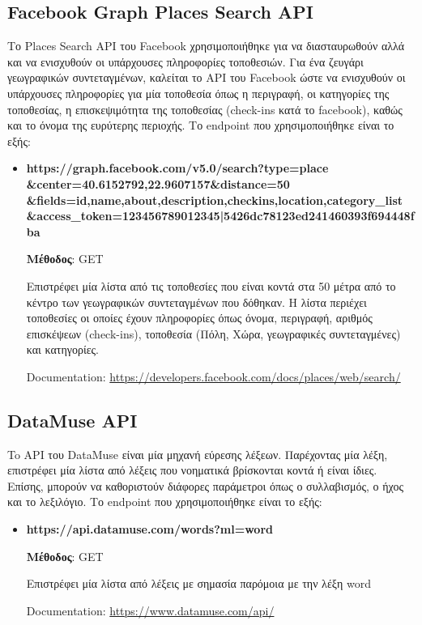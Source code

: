 \documentclass[oneside, 12pt]{book}
\begin{document}
\subsection{Facebook Graph Places Search API}\label{sec:facebook_graph_places_api}
Το Places Search API του Facebook χρησιμοποιήθηκε για να διασταυρωθούν 
αλλά και να ενισχυθούν οι υπάρχουσες πληροφορίες τοποθεσιών.
Για ένα ζευγάρι γεωγραφικών συντεταγμένων, καλείται το API του 
Facebook ώστε να ενισχυθούν οι υπάρχουσες πληροφορίες για μία 
τοποθεσία όπως η περιγραφή, οι κατηγορίες της τοποθεσίας, η 
επισκεψιμότητα της τοποθεσίας (check-ins κατά το facebook), καθώς και το όνομα της ευρύτερης περιοχής. 
Το endpoint που χρησιμοποιήθηκε είναι το εξής:
\begin{itemize}
    \item \textbf{https://graph.facebook.com/v5.0/search?type=place\\\&center=40.6152792,22.9607157\&distance=50\\\&fields=id,name,about,description,checkins,location,category\_list\\\&access\_token=123456789012345|5426dc78123ed241460393f694448fba}
    
    \textbf{Μέθοδος}: GET
    
    Επιστρέφει μία λίστα από τις τοποθεσίες που είναι κοντά στα 50 
    μέτρα από το κέντρο των γεωγραφικών συντεταγμένων που δόθηκαν.
    Η λίστα περιέχει τοποθεσίες οι οποίες έχουν πληροφορίες όπως 
    όνομα, περιγραφή, αριθμός επισκέψεων (check-ins), τοποθεσία (Πόλη, 
    Χώρα, γεωγραφικές συντεταγμένες) και κατηγορίες.
    
    Documentation: \url{https://developers.facebook.com/docs/places/web/search/}
\end{itemize}
 
\subsection{DataMuse API}\label{sec:datamuse_api_call}
To API του DataMuse είναι μία μηχανή εύρεσης λέξεων. Παρέχοντας μία 
λέξη, επιστρέφει μία λίστα από λέξεις που νοηματικά βρίσκονται κοντά ή 
είναι ίδιες. Επίσης, μπορούν να καθοριστούν διάφορες παράμετροι όπως ο 
συλλαβισμός, ο ήχος και το λεξιλόγιο. 
Το endpoint που χρησιμοποιήθηκε είναι το εξής:
\begin{itemize}
    \item \textbf{https://api.datamuse.com/words?ml={word}} 
    
    \textbf{Μέθοδος}: GET
    
    Επιστρέφει μία λίστα από λέξεις με σημασία παρόμοια με την λέξη {word}
    
    Documentation: \url{https://www.datamuse.com/api/}
\end{itemize}
\end{document}
